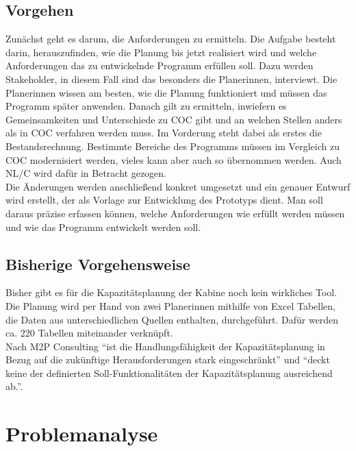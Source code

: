 \documentclass [12pt, a4paper, oneside, titlepage, ngerman]{article}
\begin{document}
\subsection {Vorgehen}
Zunächst geht es darum, die Anforderungen zu ermitteln. Die Aufgabe besteht darin, herauszufinden, wie die Planung bis jetzt realisiert wird und welche Anforderungen das zu entwickelnde Programm erfüllen soll. Dazu werden Stakeholder, in diesem Fall sind das besonders die Planerinnen, interviewt. Die Planerinnen wissen am besten, wie die Planung funktioniert und müssen das Programm später anwenden. Danach gilt zu ermitteln, inwiefern es Gemeinsamkeiten und Unterschiede zu \ac{COC} gibt und an welchen Stellen anders als in \ac{COC} verfahren werden muss. Im Vorderung steht dabei als erstes die Bestandsrechnung. Bestimmte Bereiche des Programms müssen im Vergleich zu \ac{COC} modernisiert werden, vieles kann aber auch so übernommen werden. Auch \ac{NL/C} wird dafür in Betracht gezogen. \\
Die Änderungen werden anschließend konkret umgesetzt und ein genauer Entwurf wird erstellt, der als Vorlage zur Entwicklung des Prototyps dient. Man soll daraus präzise erfassen können, welche Anforderungen wie erfüllt werden müssen und wie das Programm entwickelt werden soll.

\subsection{Bisherige Vorgehensweise}
Bisher gibt es für die Kapazitätsplanung der Kabine noch kein wirkliches Tool. Die Planung wird per Hand von zwei Planerinnen mithilfe von Excel Tabellen, die Daten aus unterschiedlichen Quellen enthalten, durchgeführt. Dafür werden ca. 220 Tabellen miteinander verknüpft. \\
Nach M2P Consulting "`ist die Handlungsfähigkeit der Kapazitätsplanung in Bezug auf die zukünftige Herausforderungen stark eingeschränkt"'\cite[S.5]{M2P} und "`deckt keine der definierten Soll-Funktionalitäten der Kapazitätsplanung ausreichend ab."'\cite[S.6]{M2P}. %
\newpage

\section{Problemanalyse}
\end{document}
